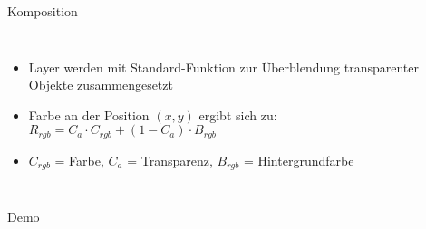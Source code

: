 \begin{frame}{Komposition}
  \begin{columns}[t]
      \begin{itemize}
        \item Layer werden mit Standard-Funktion zur Überblendung
        transparenter Objekte zusammengesetzt
        \item Farbe an der Position $(x,y)$ ergibt sich zu: $R_{rgb} = C_a \cdot
        C_{rgb} + (1-C_a) \cdot B_{rgb}$
        \item $C_{rgb}$ = Farbe, $C_a$ = Transparenz, $B_{rgb}$ = Hintergrundfarbe
      \end{itemize}
  \end{columns}
\end{frame}

\begin{frame}{Demo}
  \begin{center}
  \end{center}
\end{frame}